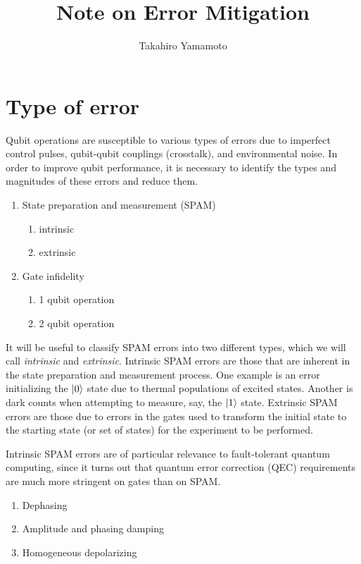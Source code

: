 \documentclass[11pt, oneside]{article}   	%
\title{Note on Error Mitigation}
\author{Takahiro Yamamoto}
\begin{document}
\maketitle
\section{Type of error}
Qubit operations are susceptible to various types of errors due to imperfect control pulses, qubit-qubit couplings (crosstalk), and environmental noise. In order to improve qubit performance, it is necessary to identify the types and magnitudes of these errors and reduce them.
\begin{enumerate}
\item State preparation and measurement (SPAM)
\begin{enumerate}
\item intrinsic
\item extrinsic
\end{enumerate}
\item Gate infidelity
\begin{enumerate}
\item {1 qubit operation}
\item {2 qubit operation}
\end{enumerate}
\end{enumerate}

It will be useful to classify SPAM errors into two different types, which we will call {\em intrinsic} and {\em extrinsic}. 
Intrinsic SPAM errors are those that are inherent in the state preparation and measurement process. 
One example is an error initializing the $\ket{0}$ state due to thermal populations of excited states. 
Another is dark counts when attempting to measure, say, the $\ket{1}$ state. 
Extrinsic SPAM errors are those due to errors in the gates used to transform the initial state to the starting state (or set of states) for the experiment to be performed. 

Intrinsic SPAM errors are of particular relevance to fault-tolerant quantum computing, since it turns out that quantum error correction (QEC) requirements are much more stringent on gates than on SPAM. 

\begin{enumerate}
\item Dephasing
\item Amplitude and phasing damping
\item Homogeneous depolarizing
\end{enumerate}
\end{document}
